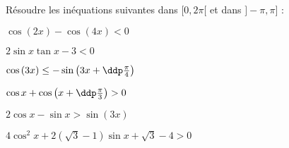 
\begin{exercice}  \;
R\'esoudre les in\'equations suivantes dans $\lbrack 0,2\pi\lbrack$ et dans $\rbrack -\pi,\pi\rbrack$ :
\begin{enumerate}
\begin{minipage}[t]{0.45\textwidth}
\item $\cos{(2x)}-\cos{(4x)}<0$
\item $2\sin{x}\tan{x}-3<0$
\item $\cos{(3x)}\leq -\sin{\left(3x+\ddp\frac{\pi}{4}\right)}$
\end{minipage}
\begin{minipage}[t]{0.45\textwidth}
\item $\cos{x}+\cos{\left(x+\ddp\frac{\pi}{3}\right)}>0$
\item $2\cos{x}-\sin{x}>\sin{(3x)}$
\item $4\cos^2{x}+2(\sqrt{3}-1)\sin{x}+\sqrt{3}-4>0$
\end{minipage}
\end{enumerate}
\end{exercice}